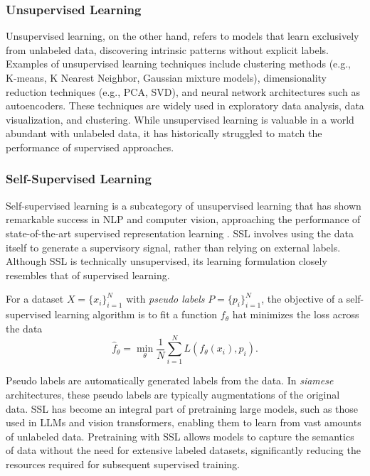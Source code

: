 \documentclass[../../thesis.tex]{subfiles}
\begin{document}
\subsubsection*{Unsupervised Learning}

Unsupervised learning, on the other hand, refers to models that learn exclusively from unlabeled data, discovering intrinsic patterns without explicit labels. Examples of unsupervised learning techniques include clustering methods (e.g., K-means, K Nearest Neighbor, Gaussian mixture models), dimensionality reduction techniques (e.g., PCA, SVD), and neural network architectures such as autoencoders. These techniques are widely used in exploratory data analysis, data visualization, and clustering. While unsupervised learning is valuable in a world abundant with unlabeled data, it has historically struggled to match the performance of supervised approaches.
\newline
\subsubsection*{Self-Supervised Learning}

Self-supervised learning is a subcategory of unsupervised learning that has shown remarkable success in NLP and computer vision, approaching the performance of state-of-the-art supervised representation learning \cite{bardes2022vicreg, zbontar2021barlow}. SSL involves using the data itself to generate a supervisory signal, rather than relying on external labels. Although SSL is technically unsupervised, its learning formulation closely resembles that of supervised learning.\newline

For a dataset $X = \{x_i\}_{i=1}^N$ with \textit{pseudo labels} $P = \{p_i\}_{i=1}^N$, the objective of a self-supervised learning algorithm is to fit a function $f_\theta$ hat minimizes the loss across the data
\begin{equation}
    \widehat{f}_\theta = \min_\theta \frac{1}{N} \sum_{i=1}^N L(f_\theta(x_i),p_i).
\end{equation}

Pseudo labels are automatically generated labels from the data. In \textit{siamese} architectures, these pseudo labels are typically augmentations of the original data. SSL has become an integral part of pretraining large models, such as those used in LLMs and vision transformers, enabling them to learn from vast amounts of unlabeled data. Pretraining with SSL allows models to capture the semantics of data without the need for extensive labeled datasets, significantly reducing the resources required for subsequent supervised training.
\end{document}
